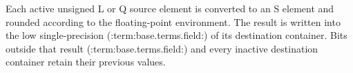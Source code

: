 Each active unsigned L or Q source element is converted to an S element and
rounded according to the floating-point environment. The result is written
into the low single-precision (:term:base.terms.field:) of its destination container. Bits
outside that result (:term:base.terms.field:) and every inactive destination container retain
their previous values.
